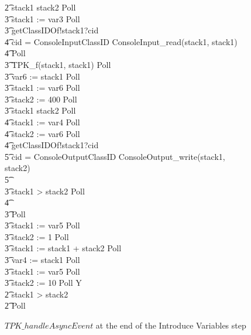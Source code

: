 \begin{figure}[tp!]
{\begin{circusaction}
    \t2 \circif stack1 \leq stack2 \circthen Poll \circseq \\
    \t3 stack1 := var3 \circseq Poll \circseq \\
    \t3 getClassIDOf!stack1?cid \then {} \\
    \t4 \circif cid = ConsoleInputClassID \circthen ConsoleInput\_read(stack1, stack1) \circseq \\
    \t4 \circfi \circseq Poll \circseq \\
    \t3 TPK\_f(stack1, stack1) \circseq Poll \circseq \\
    \t3 var6 := stack1 \circseq Poll \circseq \\
    \t3 stack1 := var6 \circseq Poll \circseq \\
    \t3 stack2 := 400 \circseq Poll \circseq \\
    \t3 \circif stack1 \leq stack2 \circthen Poll \circseq \\
    \t4 stack1 := var4 \circseq Poll \circseq \\
    \t4 stack2 := var6 \circseq Poll \circseq \\
    \t4 getClassIDOf!stack1?cid \then {} \\
    \t5 \circif cid = ConsoleOutputClassID \circthen ConsoleOutput\_write(stack1, stack2) \\
    \t5 \circfi \\
    \t3 {} \circelse stack1 > stack2 \circthen Poll \circseq \\
    \t4 {} \cdots {} \\
    \t3 \circfi \circseq Poll \circseq \\
    \t3 stack1 := var5 \circseq Poll \circseq \\
    \t3 stack2 := 1 \circseq Poll \circseq \\
    \t3 stack1 := stack1 + stack2 \circseq Poll \circseq \\
    \t3 var4 := stack1 \circseq Poll \\
    \t3 stack1 := var5 \circseq Poll \circseq \\
    \t3 stack2 := 10 \circseq Poll \circseq Y \\
    \t2 {} \circelse stack1 > stack2 \circthen \Skip \\
    \t2 \circfi \circseq Poll
  \end{circusaction}
  }
  \caption{$TPK\_handleAsyncEvent$ at the end of the Introduce
    Variables step}
  \label{efs-introduce-variables-example-figure}
\end{figure}

